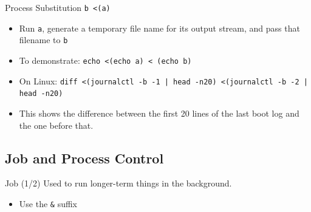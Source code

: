 \documentclass[12pt]{beamer}
\begin{document}
\begin{frame}[fragile]{Process Substitution}
  \texttt{b <(a)}
  \begin{itemize}
    \item Run \texttt{a}, generate a temporary file name for its output stream, and pass that filename to \texttt{b}
    \item To demonstrate: \texttt{echo <(echo a) < (echo b)}
    \item On Linux: \texttt{diff <(journalctl -b -1 | head -n20) <(journalctl -b -2 | head -n20)}
    \item This shows the difference between the first 20 lines of the last boot log and the one before that.
  \end{itemize}
\end{frame}

\subsection{Job and Process Control}
\begin{frame}[fragile]{Job (1/2)}
  Used to run longer-term things in the background.
  \begin{itemize}
    \item Use the \texttt{&} suffix
  \end{itemize}
\end{frame}
\end{document}
